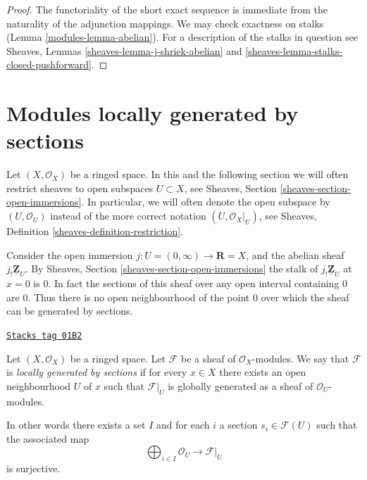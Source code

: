 \begin{proof}

The functoriality of the short exact sequence is
immediate from the naturality of the adjunction mappings.
We may check exactness on stalks (Lemma \ref{modules-lemma-abelian}).
For a description of the stalks in question see
Sheaves, Lemmas \ref{sheaves-lemma-j-shriek-abelian}
and \ref{sheaves-lemma-stalks-closed-pushforward}.
\end{proof}

\section{Modules locally generated by sections}
\label{modules-section-locally-generated}
Let $(X, \mathcal{O}_X)$ be a ringed space.
In this and the following section we will often restrict
sheaves to open subspaces $U \subset X$, see
Sheaves, Section \ref{sheaves-section-open-immersions}.
In particular, we will often denote the open subspace
by $(U, \mathcal{O}_U)$ instead of the more correct
notation $(U, \mathcal{O}_X|_U)$, see
Sheaves, Definition \ref{sheaves-definition-restriction}.

\medskip\noindent
Consider the open immersion
$j : U = (0 , \infty) \to \mathbf{R} = X$, and the abelian sheaf
$j_!\underline{\mathbf{Z}}_U$. By Sheaves, Section
\ref{sheaves-section-open-immersions} the stalk of
$j_!\underline{\mathbf{Z}}_U$ at $x = 0$ is $0$. In fact the
sections of this sheaf over any open interval containing $0$
are $0$. Thus there is no open neighbourhood of the point
$0$ over which the sheaf can be generated by sections.

\begin{definition}
\label{modules-definition-locally-generated}
\href{https://stacks.math.columbia.edu/tag/01B2}{\texttt{Stacks tag 01B2}}

Let $(X, \mathcal{O}_X)$ be a ringed space.
Let $\mathcal{F}$ be a sheaf of $\mathcal{O}_X$-modules.
We say that $\mathcal{F}$ is {\it locally generated by sections}
if for every $x \in X$ there exists an open
neighbourhood $U$ of $x$ such that $\mathcal{F}|_U$
is globally generated as a sheaf of $\mathcal{O}_U$-modules.
\end{definition}

In other words there exists a set $I$ and for
each $i$ a section $s_i \in \mathcal{F}(U)$ such
that the associated map
$$
\bigoplus\nolimits_{i \in I} \mathcal{O}_U
\longrightarrow
\mathcal{F}|_U
$$
is surjective.


